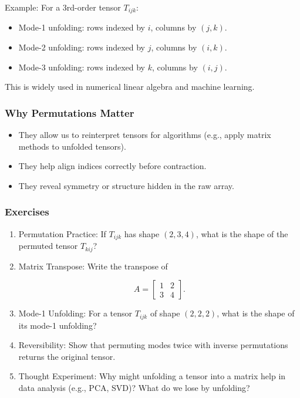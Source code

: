 \documentclass[
  letterpaper,
  DIV=11,
  numbers=noendperiod]{scrreprt}
\providecommand{\tightlist}{%
  \setlength{\itemsep}{0pt}\setlength{\parskip}{0pt}}
\begin{document}
Example: For a 3rd-order tensor \(T_{ijk}\):

\begin{itemize}
\tightlist
\item
  Mode-1 unfolding: rows indexed by \(i\), columns by \((j,k)\).
\item
  Mode-2 unfolding: rows indexed by \(j\), columns by \((i,k)\).
\item
  Mode-3 unfolding: rows indexed by \(k\), columns by \((i,j)\).
\end{itemize}

This is widely used in numerical linear algebra and machine learning.

\subsubsection{Why Permutations Matter}\label{why-permutations-matter}

\begin{itemize}
\tightlist
\item
  They allow us to reinterpret tensors for algorithms (e.g., apply
  matrix methods to unfolded tensors).
\item
  They help align indices correctly before contraction.
\item
  They reveal symmetry or structure hidden in the raw array.
\end{itemize}

\subsubsection{Exercises}\label{exercises-22}

\begin{enumerate}
\def\labelenumi{\arabic{enumi}.}
\item
  Permutation Practice: If \(T_{ijk}\) has shape \((2,3,4)\), what is
  the shape of the permuted tensor \(T_{kij}\)?
\item
  Matrix Transpose: Write the transpose of

  \[
  A = \begin{bmatrix}1 & 2 \\ 3 & 4\end{bmatrix}.
  \]
\item
  Mode-1 Unfolding: For a tensor \(T_{ijk}\) of shape \((2,2,2)\), what
  is the shape of its mode-1 unfolding?
\item
  Reversibility: Show that permuting modes twice with inverse
  permutations returns the original tensor.
\item
  Thought Experiment: Why might unfolding a tensor into a matrix help in
  data analysis (e.g., PCA, SVD)? What do we lose by unfolding?
\end{enumerate}
\end{document}
